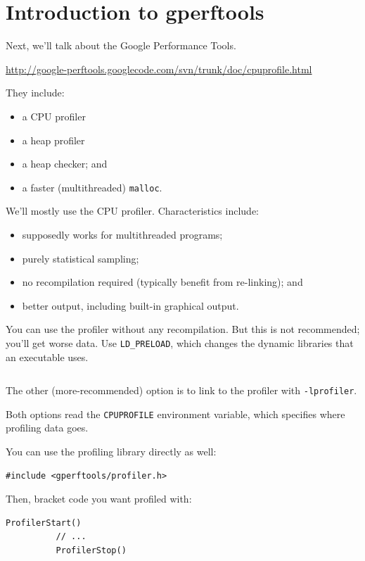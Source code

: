 \documentclass[a4paper]{report}
\begin{document}
\section*{Introduction to gperftools}
Next, we'll talk about the Google Performance Tools. 
\begin{center}
\url{http://google-perftools.googlecode.com/svn/trunk/doc/cpuprofile.html}
\end{center}
They include:
      \begin{itemize}
        \item a CPU profiler
        \item a heap profiler
        \item a heap checker; and 
        \item a faster (multithreaded) {\tt malloc}.
      \end{itemize}

We'll mostly use the CPU profiler. Characteristics include:
      \begin{itemize}
        \item  supposedly works for
multithreaded programs;
        \item purely statistical sampling;
        \item no recompilation required (typically benefit from re-linking); and
        \item better output, including built-in graphical output.
      \end{itemize}

You can use the profiler without any recompilation. But this is not recommended;
you'll get worse data. Use {\tt LD\_PRELOAD}, which changes the dynamic libraries that
an executable uses.

  \begin{lstlisting}[basicstyle=\scriptsize]
  % LD_PRELOAD="/usr/lib/libprofiler.so" CPUPROFILE=test.prof ./test
  \end{lstlisting}

The other (more-recommended) option is to link to the profiler with {\tt -lprofiler}.

Both options read the {\tt CPUPROFILE} environment variable, which
specifies where profiling data goes.

You can use the profiling library directly as well:
\begin{lstlisting}[basicstyle=\scriptsize]
          #include <gperftools/profiler.h>
\end{lstlisting}
Then, bracket code you want profiled with:
\begin{lstlisting}[basicstyle=\scriptsize]
          ProfilerStart()
          // ...
          ProfilerStop()
\end{lstlisting}
    
\end{document}
